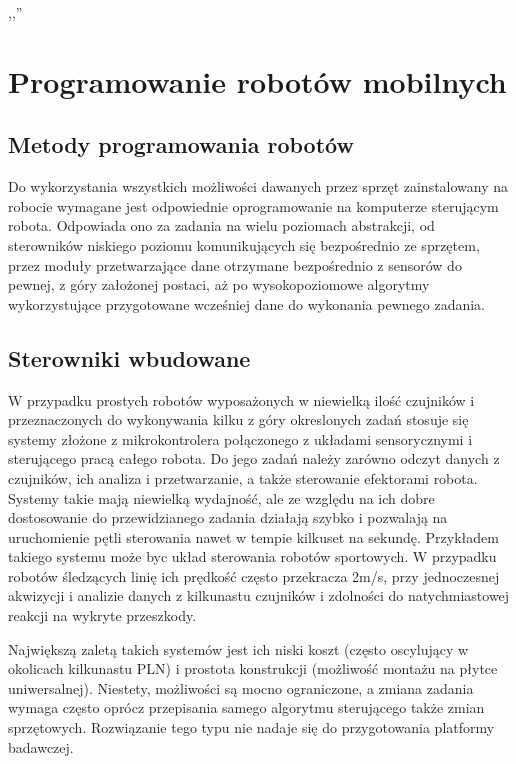 

\begin{savequote}[70mm]
,,''
\qauthor{}
\end{savequote}


\chapter{Programowanie robotów mobilnych}
\label{chap:programowanie}

\section{Metody programowania robotów}

Do wykorzystania wszystkich możliwości dawanych przez sprzęt zainstalowany na robocie
wymagane jest odpowiednie oprogramowanie na komputerze sterującym robota. Odpowiada
ono za zadania na wielu poziomach abstrakcji, od sterowników niskiego poziomu
komunikujących się bezpośrednio ze sprzętem, przez moduły przetwarzające dane otrzymane
bezpośrednio z sensorów do pewnej, z góry założonej postaci, aż po wysokopoziomowe
algorytmy wykorzystujące przygotowane wcześniej dane do wykonania pewnego zadania.

\section{Sterowniki wbudowane}

W przypadku prostych robotów wyposażonych w niewielką ilość czujników
i przeznaczonych do wykonywania kilku z góry okreslonych zadań stosuje się systemy
złożone z mikrokontrolera połączonego z układami sensorycznymi i sterującego pracą
całego robota. Do jego zadań należy zarówno odczyt danych z czujników, ich analiza
i przetwarzanie, a także sterowanie efektorami robota. Systemy takie mają niewielką
wydajność, ale ze względu na ich dobre dostosowanie do przewidzianego zadania działają
szybko i pozwalają na uruchomienie pętli sterowania nawet w tempie kilkuset na sekundę.
Przykładem takiego systemu może byc układ sterowania robotów sportowych. W przypadku
robotów śledzących linię ich prędkość często przekracza 2m/s, przy jednoczesnej
akwizycji i analizie danych z kilkunastu czujników i zdolności do natychmiastowej
reakcji na wykryte przeszkody.

Największą zaletą takich systemów jest ich niski koszt (często oscylujący w okolicach
kilkunastu PLN) i prostota konstrukcji (możliwość montażu na płytce uniwersalnej).
Niestety, możliwości są mocno ograniczone, a zmiana zadania wymaga często oprócz przepisania
samego algorytmu sterującego także zmian sprzętowych. Rozwiązanie tego typu nie nadaje
się do przygotowania platformy badawczej.

